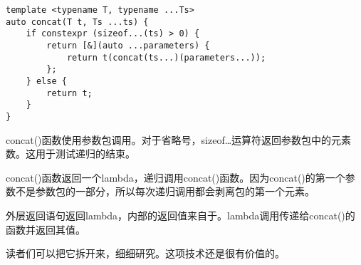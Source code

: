 \begin{lstlisting}[style=styleCXX]
template <typename T, typename ...Ts>
auto concat(T t, Ts ...ts) {
	if constexpr (sizeof...(ts) > 0) {
		return [&](auto ...parameters) {
			return t(concat(ts...)(parameters...));
		};
	} else {
		return t;
	}
}
\end{lstlisting}

concat()函数使用参数包调用。对于省略号，sizeof…运算符返回参数包中的元素数。这用于测试递归的结束。

concat()函数返回一个lambda，递归调用concat()函数。因为concat()的第一个参数不是参数包的一部分，所以每次递归调用都会剥离包的第一个元素。

外层返回语句返回lambda，内部的返回值来自于。lambda调用传递给concat()的函数并返回其值。

读者们可以把它拆开来，细细研究。这项技术还是很有价值的。





